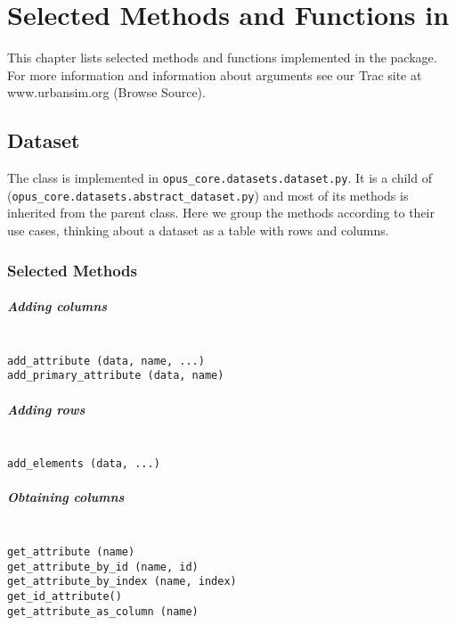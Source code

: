 
\chapter{Selected Methods and Functions in }
\label{app:selected-methods}
%
This chapter lists selected methods and functions implemented in the  package.
For more information and information about arguments see our Trac site at www.urbansim.org (Browse Source).

%
\section{Dataset}
%
\label{app:selected-methods-dataset}
%
The class  is implemented in
\verb|opus_core.datasets.dataset.py|. 
It is a child of  (\verb|opus_core.datasets.abstract_dataset.py|)
and most of its methods is inherited from the parent class. Here we group the methods 
according to their use cases, thinking about a dataset as a table with rows and columns.

%
\subsection{Selected Methods}
%
\paragraph{Adding columns}~\\[1mm]
{\tt add\_attribute (data, name, ...)}\\
{\tt add\_primary\_attribute (data, name)}

\paragraph{Adding rows}~\\[1mm]
{\tt add\_elements (data, ...)}

\paragraph{Obtaining columns}~\\[1mm]
{\tt get\_attribute (name)} \\
{\tt get\_attribute\_by\_id (name, id)} \\
{\tt get\_attribute\_by\_index (name, index)}\\
{\tt get\_id\_attribute()} \\
{\tt get\_attribute\_as\_column (name)}

